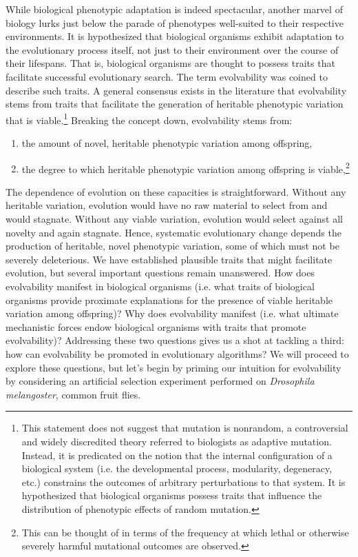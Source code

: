 While biological phenotypic adaptation is indeed spectacular, another marvel of biology lurks just below the parade of phenotypes well-suited to their respective environments. It is hypothesized that biological organisms exhibit adaptation to the evolutionary process itself, not just to their environment over the course of their lifespans. That is, biological organisms are thought to possess traits that facilitate successful evolutionary search. The term evolvability was coined to describe such traits. A general consensus exists in the literature that evolvability stems from traits that facilitate the generation of heritable phenotypic variation that is viable.\footnote{This statement does not suggest that mutation is nonrandom, a controversial and widely discredited theory referred to biologists as adaptive mutation. Instead, it is predicated on the notion that the internal configuration of a biological system (i.e. the developmental process, modularity, degeneracy, etc.) constrains the outcomes of arbitrary perturbations to that system. It is hypothesized that biological organisms possess traits that influence the distribution of phenotypic effects of random mutation.} Breaking the concept down, evolvability stems from:
\begin{enumerate}
\item the amount of novel, heritable phenotypic variation among offspring,
\item the degree to which heritable phenotypic variation among offspring is viable,\footnote{This can be thought of in terms of the frequency at which lethal or otherwise severely harmful mutational outcomes are observed.}
\end{enumerate}
The dependence of evolution on these capacities is straightforward. Without any heritable variation, evolution would have no raw material to select from and would stagnate. Without any viable variation, evolution would select against all novelty and again stagnate. Hence, systematic evolutionary change depends the production of heritable, novel phenotypic variation, some of which must not be severely deleterious. We have established plausible traits that might facilitate evolution, but several important questions remain unanswered. How does evolvability manifest in biological organisms (i.e. what traits of biological organisms provide proximate explanations for the presence of viable heritable variation among offspring)? Why does evolvability manifest (i.e. what ultimate mechanistic forces endow biological organisms with traits that promote evolvability)? Addressing these two questions gives us a shot at tackling a third: how can evolvability be promoted in evolutionary algorithms? We will proceed to explore these questions, but let's begin by priming our intuition for evolvability by considering an artificial selection experiment performed on \textit{Drosophila melangoster}, common fruit flies.

